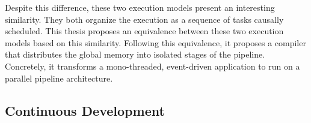 \begin{figure}
  \centering{}
\end{figure}

Despite this difference, these two execution models present an interesting similarity.
They both organize the execution as a sequence of tasks causally scheduled. %
This thesis proposes an equivalence between these two execution models based on this similarity.
Following this equivalence, it proposes a compiler that distributes the global memory into isolated stages of the pipeline.
Concretely, it transforms a mono-threaded, event-driven application to run on a parallel pipeline architecture.

\subsection{Continuous Development}


